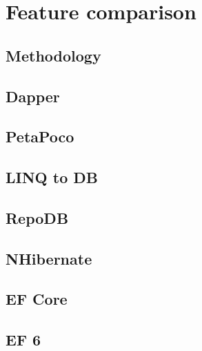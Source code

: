 \section{Feature comparison}
\subsection{Methodology}

\subsection{Dapper}
\subsection{PetaPoco}
\subsection{LINQ to DB}
\subsection{RepoDB}
\subsection{NHibernate}
\subsection{EF Core}
\subsection{EF 6}